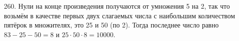 260. Нули на конце произведения получаются от умножения 5 на 2, так что возьмём в качестве первых двух слагаемых числа с наибольшим количеством пятёрок в множителях, это 25 и 50 (по 2). Тогда последнее число равно $83-25-50=8$ и $25\cdot50\cdot8=10000.$\\
